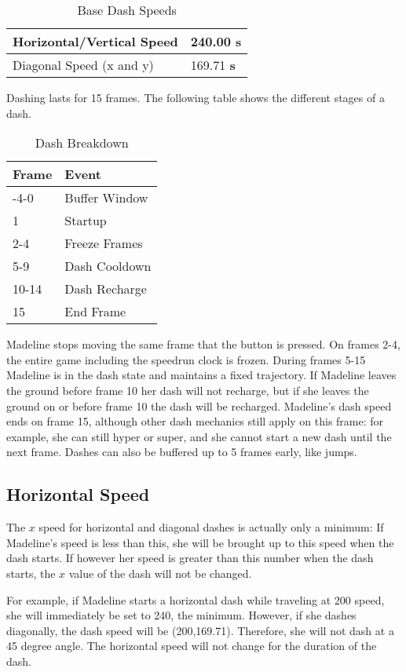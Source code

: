 \documentclass[oneside]{book}
\newcommand{\s}{\textbf{s}}
\begin{document}
\begin{table}[h]
\begin{tabular}{|l|l|}
\hline
Horizontal/Vertical Speed&240.00 \s\\
\hline
Diagonal Speed (x and y)&169.71 \s\\
\hline
\end{tabular}
\caption{Base Dash Speeds}
\end{table}

Dashing lasts for 15 frames. The following table shows the different stages of a dash.

\begin{table}[h]
\begin{tabular}{|l|l|}
\hline
Frame&Event\\
\hline
-4-0&Buffer Window\\
\hline
1&Startup\\
\hline
2-4&Freeze Frames\\
\hline
5-9&Dash Cooldown\\
\hline
10-14&Dash Recharge\\
\hline
15&End Frame\\
\hline
\end{tabular}
\caption{Dash Breakdown}
\end{table}

Madeline stops moving the same frame that the button is pressed. On frames 2-4, the entire game including the speedrun clock is frozen. During frames 5-15 Madeline is in the dash state and maintains a fixed trajectory. If Madeline leaves the ground before frame 10 her dash will not recharge, but if she leaves the ground on or before frame 10 the dash will be recharged. Madeline's dash speed ends on frame 15, although other dash mechanics still apply on this frame: for example, she can still hyper or super, and she cannot start a new dash until the next frame. Dashes can also be buffered up to 5 frames early, like jumps.

\subsection{Horizontal Speed}

The $x$ speed for horizontal and diagonal dashes is actually only a minimum: If Madeline's speed is less than this, she will be brought up to this speed when the dash starts. If however her speed is greater than this number when the dash starts, the $x$ value of the dash will not be changed.

For example, if Madeline starts a horizontal dash while traveling at 200 speed, she will immediately be set to 240, the minimum. However, if she dashes diagonally, the dash speed will be (200,169.71). Therefore, she will not dash at a 45 degree angle. The horizontal speed will not change for the duration of the dash.
\end{document}
